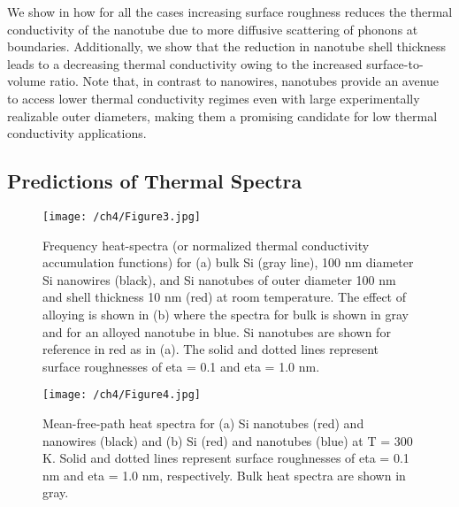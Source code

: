 We show in  how for all the cases increasing surface roughness reduces the thermal conductivity of the nanotube due to more diffusive scattering of phonons at boundaries. Additionally, we show that the reduction in nanotube shell thickness leads to a decreasing thermal conductivity owing to the increased surface-to-volume ratio. Note that, in contrast to nanowires, nanotubes provide an avenue to access lower thermal conductivity regimes even with large experimentally realizable outer diameters, making them a promising candidate for low thermal conductivity applications.


\subsection{Predictions of Thermal Spectra}

\begin{figure}[b!]
	\centering \texttt{[image: /ch4/Figure3.jpg]}
	\caption{Frequency heat-spectra (or normalized thermal conductivity accumulation functions) for (a) bulk Si (gray line), 100 nm diameter Si nanowires (black), and Si nanotubes of outer diameter 100 nm and shell thickness 10 nm (red) at room temperature. The effect of alloying is shown in (b) where the spectra for bulk  is shown in gray and for an alloyed nanotube in blue. Si nanotubes are shown for reference in red as in (a). The solid and dotted lines represent surface roughnesses of \gls{eta} = 0.1 and \gls{eta} = 1.0 nm.}
	\label{fig:nt_fig3}
\end{figure}

\begin{figure}[b!]
	\centering \texttt{[image: /ch4/Figure4.jpg]}
	\caption{Mean-free-path heat spectra for (a) Si nanotubes (red) and nanowires (black) and (b) Si (red) and  nanotubes (blue) at \gls{T} = 300 K. Solid and dotted lines represent surface roughnesses of \gls{eta} = 0.1 nm and \gls{eta} = 1.0 nm, respectively. Bulk heat spectra are shown in gray.}
	\label{fig:nt_fig4}
\end{figure}

